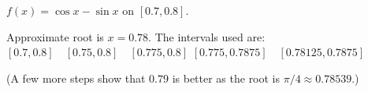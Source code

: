 {$f(x) = \cos x -\sin x$ on $[0.7,0.8]$.
}
{Approximate root is $x=0.78$. The intervals used are:
$[0.7,0.8] \quad [0.75,0.8] \quad [0.775,0.8]$
$[0.775,0.7875]\quad [0.78125,0.7875]$

(A few more steps show that $0.79$ is better as the root is $\pi/4 \approx 0.78539$.)
}
